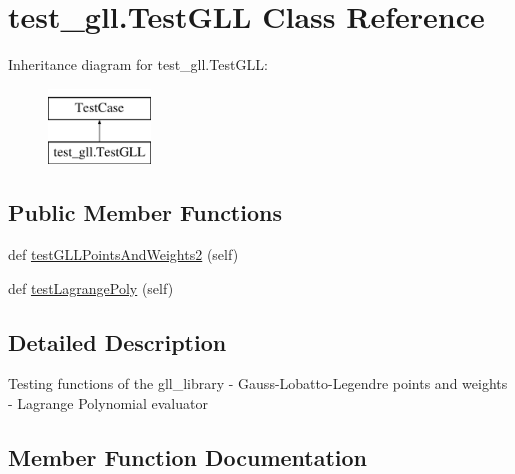 \hypertarget{classtest__gll_1_1_test_g_l_l}{}\section{test\+\_\+gll.\+Test\+G\+LL Class Reference}
\label{classtest__gll_1_1_test_g_l_l}
Inheritance diagram for test\+\_\+gll.\+Test\+G\+LL\+:\begin{figure}[H]
\begin{center}
\leavevmode
\includegraphics[height=2.000000cm]{classtest__gll_1_1_test_g_l_l}
\end{center}
\end{figure}
\subsection*{Public Member Functions}
\begin{DoxyCompactItemize}
\item 
def \mbox{\hyperlink{classtest__gll_1_1_test_g_l_l_a1357eaab2f6d378ac53e9ae0276d2a2b}{test\+G\+L\+L\+Points\+And\+Weights2}} (self)
\item 
def \mbox{\hyperlink{classtest__gll_1_1_test_g_l_l_a95fd324973c22c9edae81c4adbed0c4f}{test\+Lagrange\+Poly}} (self)
\end{DoxyCompactItemize}


\subsection{Detailed Description}
\begin{DoxyVerb}Testing functions of the gll_library 
- Gauss-Lobatto-Legendre points and weights
- Lagrange Polynomial evaluator\end{DoxyVerb}
 

\subsection{Member Function Documentation}
\mbox{\label{classtest__gll_1_1_test_g_l_l_a1357eaab2f6d378ac53e9ae0276d2a2b}} 
